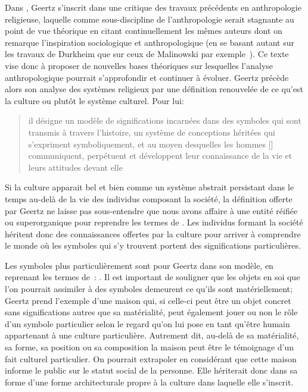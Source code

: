Dans , Geertz s'inscrit dans une critique des travaux précédents en anthropologie religieuse, laquelle comme sous-discipline de l'anthropologie serait stagnante au point de vue théorique en citant continuellement les mêmes auteurs dont on remarque l'inspiration sociologique et anthropologique (en se basant autant sur les travaux de Durkheim que sur ceux de Malinowski par exemple~\citep[20]{Geertz1972}). 
Ce texte vise donc à proposer de nouvelles bases théoriques sur lesquelles l'analyse anthropologique pourrait s'approfondir et continuer à évoluer. 
Geertz précède alors son analyse des systèmes religieux par une définition renouvelée de ce qu'est la culture ou plutôt le système culturel. 
Pour lui: \blockquote[{\cite[21]{Geertz1972}}][.]{\textelp{} il désigne un modèle de significations incarnées dans des symboles qui sont transmis à travers l'histoire, un système de conceptions héritées qui s'expriment symboliquement, et au moyen desquelles les hommes [] communiquent, perpétuent et développent leur connaissance de la vie et leurs attitudes devant elle}.

Si la culture apparait bel et bien comme un système abstrait persistant dans le temps au-delà de la vie des individus composant la société, la définition offerte par Geertz ne laisse pas sous-entendre que nous avons affaire à une entité réifiée ou superorganique pour reprendre les termes de \citet{Duncan1980}. 
Les individus formant la société héritent donc des connaissances offertes par la culture pour arriver à comprendre le monde où les symboles qui s'y trouvent portent des significations particulières.

Les symboles plus particulièrement sont pour Geertz dans son modèle, en reprenant les termes de~\cite{Langer1962}: . 
Il est important de souligner que les objets en soi que l'on pourrait assimiler à des symboles demeurent ce qu'ils sont matériellement; Geertz prend l'exemple d'une maison qui, si celle-ci peut être un objet concret sans significations autres que sa matérialité, peut également jouer ou non le rôle d'un symbole particulier selon le regard qu'on lui pose en tant qu'être humain appartenant à une culture particulière. 
Autrement dit, au-delà de sa matérialité, sa forme, sa position ou sa composition la maison peut être le témoignage d'un fait culturel particulier. 
On pourrait extrapoler en considérant que cette maison informe le public sur le statut social de la personne. 
 Elle hériterait donc dans sa forme d'une forme architecturale propre à la culture dans laquelle elle s'inscrit.

